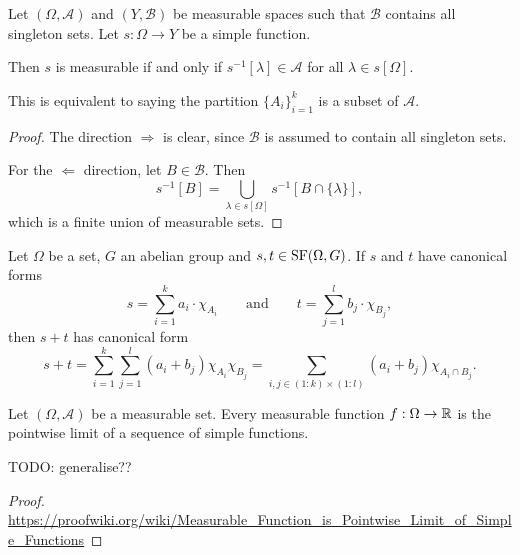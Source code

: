 \begin{lemma}
Let $(\Omega, \mathcal{A})$ and $(Y, \mathcal{B})$ be measurable spaces such that $\mathcal{B}$ contains all singleton sets. Let $s:\Omega\to Y$ be a simple function.

Then $s$ is measurable \textup{if and only if} $s^{-1}[\lambda]\in\mathcal{A}$ for all $\lambda\in s[\Omega]$.

This is equivalent to saying the partition $\{A_i\}_{i=1}^k$ is a subset of $\mathcal{A}$.
\end{lemma}
\begin{proof}
The direction $\boxed{\Rightarrow}$ is clear, since $\mathcal{B}$ is assumed to contain all singleton sets.

For the $\boxed{\Leftarrow}$ direction, let $B\in \mathcal{B}$. Then
\[ s^{-1}[B] = \bigcup_{\lambda\in s[\Omega]}s^{-1}[B\cap \{\lambda\}], \]
which is a finite union of measurable sets.
\end{proof}

\begin{lemma}
Let $\Omega$ be a set, $G$ an abelian group and $s,t\in\operatorname{SF}(\Omega,G)$. If $s$ and $t$ have canonical forms
\[ s = \sum_{i=1}^k a_i\cdot\chi_{A_i} \qquad\text{and}\qquad t = \sum_{j=1}^l b_j\cdot\chi_{B_j}, \]
then $s+t$ has canonical form
\[ s+t = \sum_{i=1}^k\sum_{j=1}^l (a_i+b_j)\chi_{A_i}\chi_{B_j} = \sum_{i,j \in (1:k)\times(1:l)}(a_i+b_j)\chi_{A_i\cap B_j}. \]
\end{lemma}

\begin{proposition}
Let $(\Omega,\mathcal{A})$ be a measurable set. Every measurable function $f:\Omega\to \mathbb{R}$ is the pointwise limit of a sequence of simple functions.
\end{proposition}
TODO: generalise??
\begin{proof}
\url{https://proofwiki.org/wiki/Measurable_Function_is_Pointwise_Limit_of_Simple_Functions}
\end{proof}

